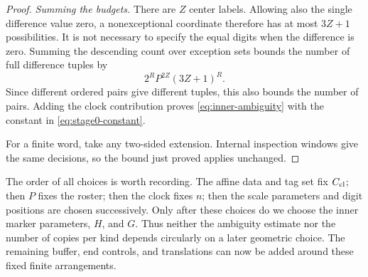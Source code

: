 \begin{proof}
\emph{Summing the budgets.}
There are $Z$ center labels.  Allowing also the single difference
value zero, a nonexceptional coordinate therefore has at most
$3Z+1$ possibilities.  It is not necessary to specify the equal
digits when the difference is zero.  Summing the descending count
over exception sets bounds the number of full difference tuples by
\[
                  2^R P^{2Z}(3Z+1)^R.
\]
Since different ordered pairs give different tuples, this also bounds
the number of pairs.  Adding the clock contribution proves
\eqref{eq:inner-ambiguity} with the constant in
\eqref{eq:stage0-constant}.

For a finite word, take any two-sided extension.  Internal inspection
windows give the same decisions, so the bound just proved applies
unchanged.
\end{proof}

The order of all choices is worth recording.  The affine data and tag
set fix $C_{\rm cl}$; then $P$ fixes the roster; then the clock fixes
$n$; then the scale parameters and digit positions are chosen
successively.  Only after these choices do we choose the inner marker
parameters, $H$, and $G$.  Thus neither the ambiguity estimate nor the
number of copies per kind depends circularly on a later geometric
choice.  The remaining buffer, end controls, and translations can now
be added around these fixed finite arrangements.
